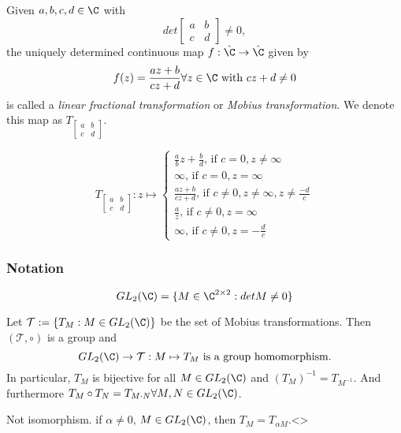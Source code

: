 \begin{definition}
  Given $a,b,c,d \in \C$ with
  $$
  det
  \begin{bmatrix}
    a & b \\
    c & d
  \end{bmatrix}
  \neq0,
  $$
the uniquely determined continuous map $f:\hat{\C}\to \hat{\C}$ given by
  $$f(z)=\frac{az+b}{cz+d} \forall z\in \C \text{ with }cz+d\neq 0$$
  is called a \emph{linear fractional transformation} or \emph{Mobius transformation}.
  \newline
  We denote this map as $T_{
  \begin{bmatrix}
    a & b \\
    c & d
  \end{bmatrix}}$.
\end{definition}
\begin{remark}
  $$T_{
  \begin{bmatrix}
    a & b \\
    c & d
  \end{bmatrix}}:z \mapsto
  \begin{cases}
    \frac{a}{b}z+\frac{b}{d} \text{, if }c=0, z\neq \infty \\
    \infty                   \text{, if } c=0, z=\infty \\
    \frac{az+b}{cz+d}        \text{, if }c\neq 0, z\neq \infty, z\neq \frac{-d}{c} \\
    \frac{a}{z}              \text{, if }c\neq 0, z=\infty \\
    \infty                   \text{, if }c\neq 0, z=-\frac{d}{c}
  \end{cases}
  $$
\end{remark}

\subsubsection*{Notation}
$$GL_2(\C)=\{M\in \C^{2\times 2}: det M\neq 0\}$$

\begin{lemma}
  Let $\mathcal{T}:=\{T_M: M\in GL_2(\C)\}$ be the set of Mobius transformations. Then $(\mathcal{T},\circ)$ is a group and
    $$GL_2(\C)\to \mathcal{T}:M\mapsto T_M \text{ is a group homomorphism}.$$
  In particular, $T_M$ is bijective for all $M\in GL_2(\C)$ and $(T_M)^{-1}=T_{M^{-1}}$. And furthermore $T_M\circ T_N=T_{M\cdot N}\forall M,N \in GL_2(\C)$.
\end{lemma}
\begin{remark}
  Not isomorphism. if $\alpha \neq 0$, $M\in GL_2(\C)$, then $T_M=T_{\alpha M}$.<>
\end{remark}

